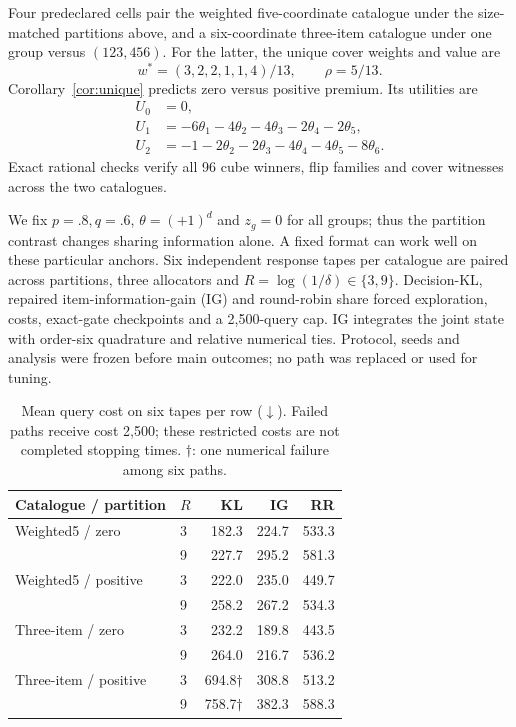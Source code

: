 Four predeclared cells pair the weighted five-coordinate catalogue under the size-matched partitions above, and a six-coordinate three-item catalogue under one group versus $(123,456)$. For the latter, the unique cover weights and value are
\[
 w^*=(3,2,2,1,1,4)/13,\qquad \rho=5/13.
\]
Corollary~\ref{cor:unique} predicts zero versus positive premium. Its utilities are
\[
\begin{aligned}
 U_0&=0,\\
 U_1&=-6\theta_1-4\theta_2-4\theta_3-2\theta_4-2\theta_5,\\
 U_2&=-1-2\theta_2-2\theta_3-4\theta_4-4\theta_5-8\theta_6.
\end{aligned}
\]
Exact rational checks verify all 96 cube winners, flip families and cover witnesses across the two catalogues.

We fix $p=.8,q=.6$, $\theta=(+1)^d$ and $z_g=0$ for all groups; thus the partition contrast changes sharing information alone. A fixed format can work well on these particular anchors. Six independent response tapes per catalogue are paired across partitions, three allocators and $R=\log(1/\delta)\in\{3,9\}$. Decision-KL, repaired item-information-gain (IG) and round-robin share forced exploration, costs, exact-gate checkpoints and a 2,500-query cap. IG integrates the joint state with order-six quadrature and relative numerical ties. Protocol, seeds and analysis were frozen before main outcomes; no path was replaced or used for tuning.

\begin{table}[t]
\caption{Mean query cost on six tapes per row ($\downarrow$). Failed paths receive cost 2,500; these restricted costs are not completed stopping times. $\dagger$: one numerical failure among six paths.}
\label{tab:cost}
\centering
\setlength{\tabcolsep}{5pt}
\begin{tabular}{llrrr}
\toprule
Catalogue / partition & $R$ & KL & IG & RR\\
\midrule
Weighted5 / zero & 3 & 182.3 & 224.7 & 533.3\\
 & 9 & 227.7 & 295.2 & 581.3\\
Weighted5 / positive & 3 & 222.0 & 235.0 & 449.7\\
 & 9 & 258.2 & 267.2 & 534.3\\
Three-item / zero & 3 & 232.2 & 189.8 & 443.5\\
 & 9 & 264.0 & 216.7 & 536.2\\
Three-item / positive & 3 & 694.8$\dagger$ & 308.8 & 513.2\\
 & 9 & 758.7$\dagger$ & 382.3 & 588.3\\
\bottomrule
\end{tabular}
\end{table}

